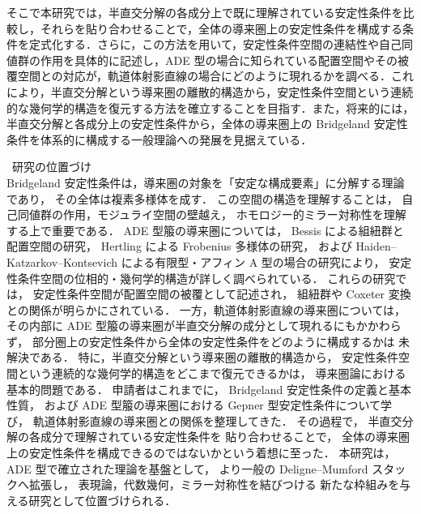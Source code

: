 \documentclass[11pt,a4paper]{ltjsarticle}
\newcommand{\研究課題名}{軌道体射影直線の導来圏の半直交分解とBridgeland安定性条件に関する研究}
\newcommand{\研究機関名}{大阪大学}
\newcommand{\研究代表者氏名}{山本 雄大}
\begin{document}
そこで本研究では，半直交分解の各成分上で既に理解されている安定性条件を比較し，それらを貼り合わせることで，全体の導来圏上の安定性条件を構成する条件を定式化する．さらに，この方法を用いて，安定性条件空間の連結性や自己同値群の作用を具体的に記述し，ADE 型の場合に知られている配置空間やその被覆空間との対応が，軌道体射影直線の場合にどのように現れるかを調べる．これにより，半直交分解という導来圏の離散的構造から，安定性条件空間という連続的な幾何学的構造を復元する方法を確立することを目指す．また，将来的には，半直交分解と各成分上の安定性条件から，全体の導来圏上の Bridgeland 安定性条件を体系的に構成する一般理論への発展を見据えている．\par
\bullet\ 研究の位置づけ\\
Bridgeland 安定性条件は，導来圏の対象を「安定な構成要素」に分解する理論であり，
その全体は複素多様体を成す．
この空間の構造を理解することは，
自己同値群の作用，モジュライ空間の壁越え，
ホモロジー的ミラー対称性を理解する上で重要である．
ADE 型箙の導来圏については，
Bessis による組紐群と配置空間の研究，
Hertling による Frobenius 多様体の研究，
および Haiden--Katzarkov--Kontsevich による有限型・アフィン A 型の場合の研究により，
安定性条件空間の位相的・幾何学的構造が詳しく調べられている．
これらの研究では，
安定性条件空間が配置空間の被覆として記述され，
組紐群や Coxeter 変換との関係が明らかにされている．
一方，軌道体射影直線の導来圏については，
その内部に ADE 型箙の導来圏が半直交分解の成分として現れるにもかかわらず，
部分圏上の安定性条件から全体の安定性条件をどのように構成するかは
未解決である．
特に，半直交分解という導来圏の離散的構造から，
安定性条件空間という連続的な幾何学的構造をどこまで復元できるかは，
導来圏論における基本的問題である．
申請者はこれまでに，
Bridgeland 安定性条件の定義と基本性質，
および ADE 型箙の導来圏における Gepner 型安定性条件について学び，
軌道体射影直線の導来圏との関係を整理してきた．
その過程で，
半直交分解の各成分で理解されている安定性条件を
貼り合わせることで，
全体の導来圏上の安定性条件を構成できるのではないかという着想に至った．
本研究は，
ADE 型で確立された理論を基盤として，
より一般の Deligne--Mumford スタックへ拡張し，
表現論，代数幾何，ミラー対称性を結びつける
新たな枠組みを与える研究として位置づけられる．






\end{document}
